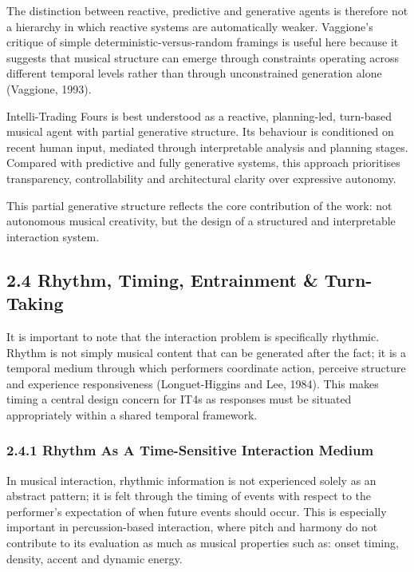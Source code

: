 The distinction between reactive, predictive and generative agents is
therefore not a hierarchy in which reactive systems are automatically
weaker. Vaggione's critique of simple deterministic-versus-random
framings is useful here because it suggests that musical structure can
emerge through constraints operating across different temporal levels
rather than through unconstrained generation alone (Vaggione, 1993).

Intelli-Trading Fours is best understood as a reactive, planning-led,
turn-based musical agent with partial generative structure. Its
behaviour is conditioned on recent human input, mediated through
interpretable analysis and planning stages. Compared with predictive and
fully generative systems, this approach prioritises transparency,
controllability and architectural clarity over expressive autonomy.

This partial generative structure reflects the core contribution of the
work: not autonomous musical creativity, but the design of a structured
and interpretable interaction system.

\subsection{2.4 Rhythm, Timing, Entrainment \&
Turn-Taking}\label{rhythm-timing-entrainment-turn-taking}

It is important to note that the interaction problem is specifically
rhythmic. Rhythm is not simply musical content that can be generated
after the fact; it is a temporal medium through which performers
coordinate action, perceive structure and experience responsiveness
(Longuet-Higgins and Lee, 1984). This makes timing a central design
concern for IT4s as responses must be situated appropriately within a
shared temporal framework.

\subsubsection{2.4.1 Rhythm As A Time-Sensitive Interaction
Medium}\label{rhythm-as-a-time-sensitive-interaction-medium}

In musical interaction, rhythmic information is not experienced solely
as an abstract pattern; it is felt through the timing of events with
respect to the performer's expectation of when future events should
occur. This is especially important in percussion-based interaction,
where pitch and harmony do not contribute to its evaluation as much as
musical properties such as: onset timing, density, accent and dynamic
energy.

